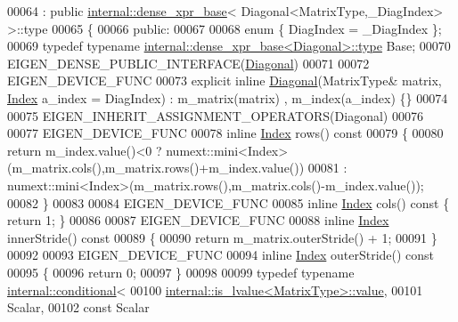 \begin{DoxyCode}
00064    : \textcolor{keyword}{public} \hyperlink{struct_eigen_1_1internal_1_1dense__xpr__base}{internal::dense\_xpr\_base}< Diagonal<MatrixType,\_DiagIndex> >::type
00065 \{
00066   \textcolor{keyword}{public}:
00067 
00068     \textcolor{keyword}{enum} \{ DiagIndex = \_DiagIndex \};
00069     \textcolor{keyword}{typedef} \textcolor{keyword}{typename} \hyperlink{struct_eigen_1_1internal_1_1dense__xpr__base}{internal::dense\_xpr\_base<Diagonal>::type} Base;
00070     EIGEN\_DENSE\_PUBLIC\_INTERFACE(\hyperlink{group___core___module_class_eigen_1_1_diagonal}{Diagonal})
00071 
00072     EIGEN\_DEVICE\_FUNC
00073     \textcolor{keyword}{explicit} \textcolor{keyword}{inline} \hyperlink{group___core___module_class_eigen_1_1_diagonal}{Diagonal}(MatrixType& matrix, \hyperlink{namespace_eigen_a62e77e0933482dafde8fe197d9a2cfde}{Index} a\_index = DiagIndex) : m\_matrix(matrix)
      , m\_index(a\_index) \{\}
00074 
00075     EIGEN\_INHERIT\_ASSIGNMENT\_OPERATORS(Diagonal)
00076 
00077     EIGEN\_DEVICE\_FUNC
00078     \textcolor{keyword}{inline} \hyperlink{namespace_eigen_a62e77e0933482dafde8fe197d9a2cfde}{Index} rows()\textcolor{keyword}{ const}
00079 \textcolor{keyword}{    }\{
00080       \textcolor{keywordflow}{return} m\_index.value()<0 ? numext::mini<Index>(m\_matrix.cols(),m\_matrix.rows()+m\_index.value())
00081                                : numext::mini<Index>(m\_matrix.rows(),m\_matrix.cols()-m\_index.value());
00082     \}
00083 
00084     EIGEN\_DEVICE\_FUNC
00085     \textcolor{keyword}{inline} \hyperlink{namespace_eigen_a62e77e0933482dafde8fe197d9a2cfde}{Index} cols()\textcolor{keyword}{ const }\{ \textcolor{keywordflow}{return} 1; \}
00086 
00087     EIGEN\_DEVICE\_FUNC
00088     \textcolor{keyword}{inline} \hyperlink{namespace_eigen_a62e77e0933482dafde8fe197d9a2cfde}{Index} innerStride()\textcolor{keyword}{ const}
00089 \textcolor{keyword}{    }\{
00090       \textcolor{keywordflow}{return} m\_matrix.outerStride() + 1;
00091     \}
00092 
00093     EIGEN\_DEVICE\_FUNC
00094     \textcolor{keyword}{inline} \hyperlink{namespace_eigen_a62e77e0933482dafde8fe197d9a2cfde}{Index} outerStride()\textcolor{keyword}{ const}
00095 \textcolor{keyword}{    }\{
00096       \textcolor{keywordflow}{return} 0;
00097     \}
00098 
00099     \textcolor{keyword}{typedef} \textcolor{keyword}{typename} \hyperlink{struct_eigen_1_1internal_1_1conditional}{internal::conditional}<
00100                        \hyperlink{struct_eigen_1_1internal_1_1is__lvalue}{internal::is\_lvalue<MatrixType>::value},
00101                        Scalar,
00102                        \textcolor{keyword}{const} Scalar

\end{DoxyCode}
